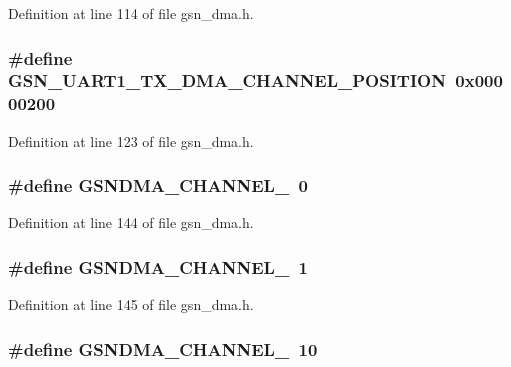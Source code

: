 Definition at line 114 of file gsn\_\-dma.h.

\hypertarget{a00484_ac9aa5902379af876a5371ab24a510bff}{
\subsubsection[{GSN\_\-UART1\_\-TX\_\-DMA\_\-CHANNEL\_\-POSITION}]{\setlength{\rightskip}{0pt plus 5cm}\#define GSN\_\-UART1\_\-TX\_\-DMA\_\-CHANNEL\_\-POSITION~0x00000200}}
\label{a00484_ac9aa5902379af876a5371ab24a510bff}


Definition at line 123 of file gsn\_\-dma.h.

\hypertarget{a00484_a71f8e6c80cdbf3c086ef3e31be6c9168}{
\subsubsection[{GSNDMA\_\-CHANNEL\_\-0}]{\setlength{\rightskip}{0pt plus 5cm}\#define GSNDMA\_\-CHANNEL\_~0}}
\label{a00484_a71f8e6c80cdbf3c086ef3e31be6c9168}


Definition at line 144 of file gsn\_\-dma.h.

\hypertarget{a00484_aafc0246b2f3e95feffb5213a48966346}{
\subsubsection[{GSNDMA\_\-CHANNEL\_\-1}]{\setlength{\rightskip}{0pt plus 5cm}\#define GSNDMA\_\-CHANNEL\_~1}}
\label{a00484_aafc0246b2f3e95feffb5213a48966346}


Definition at line 145 of file gsn\_\-dma.h.

\hypertarget{a00484_a6600eb8ee630a08b0d530bb68b12edb7}{
\subsubsection[{GSNDMA\_\-CHANNEL\_\-10}]{\setlength{\rightskip}{0pt plus 5cm}\#define GSNDMA\_\-CHANNEL\_~10}}
\label{a00484_a6600eb8ee630a08b0d530bb68b12edb7}


